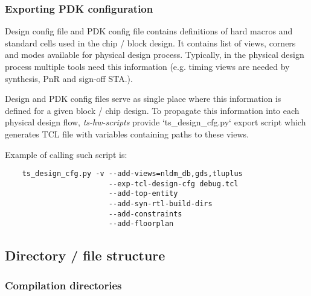 \documentclass{tropic_design_spec}
\begin{document}
\subsubsection{Exporting PDK configuration}
\label{sec:exporting-pdk-configuration}

Design config file and PDK config file contains definitions of hard macros and standard
cells used in the chip / block design. It contains list of views, corners and modes
available for physical design process. Typically, in the physical design process multiple
tools need this information (e.g. timing views are needed by synthesis, PnR and sign-off STA.).

Design and PDK config files serve as single place where this information is defined for
a given block / chip design. To propagate this information into each physical design flow,
\textit{ts-hw-scripts} provide `ts_design_cfg.py` export script which generates TCL file with
variables containing paths to these views.

Example of calling such script is:
\begin{lstlisting}
    ts_design_cfg.py -v --add-views=nldm_db,gds,tluplus
                        --exp-tcl-design-cfg debug.tcl
                        --add-top-entity
                        --add-syn-rtl-build-dirs
                        --add-constraints
                        --add-floorplan    
\end{lstlisting}



\subsection{Directory / file structure}

\subsubsection{Compilation directories}
\label{sec:compilation-directories}
\end{document}
